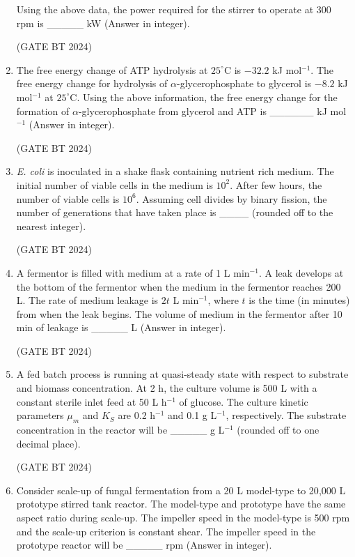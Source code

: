 \documentclass[journal,12pt,onecolumn]{IEEEtran}
\theoremstyle{remark}
\begin{document}
\begin{enumerate}
Using the above data, the power required for the stirrer to operate at 300 rpm is \_\_\_\_\_ kW (Answer in integer).

\hfill (GATE BT 2024)

\item The free energy change of ATP hydrolysis at $25^\circ$C is $-32.2$ kJ mol$^{-1}$. The free energy change for hydrolysis of $\alpha$-glycerophosphate to glycerol is $-8.2$ kJ mol$^{-1}$ at $25^\circ$C. Using the above information, the free energy change for the formation of $\alpha$-glycerophosphate from glycerol and ATP is \_\_\_\_\_\_ kJ mol$^{-1}$ (Answer in integer).

\hfill (GATE BT 2024)

\item \textit{E. coli} is inoculated in a shake flask containing nutrient rich medium. The initial number of viable cells in the medium is $10^2$. After few hours, the number of viable cells is $10^6$. Assuming cell divides by binary fission, the number of generations that have taken place is \_\_\_\_ (rounded off to the nearest integer).

\hfill (GATE BT 2024)

\item A fermentor is filled with medium at a rate of 1 L min$^{-1}$. A leak develops at the bottom of the fermentor when the medium in the fermentor reaches 200 L. The rate of medium leakage is $2t$ L min$^{-1}$, where $t$ is the time (in minutes) from when the leak begins. The volume of medium in the fermentor after 10 min of leakage is \_\_\_\_\_ L (Answer in integer).

\hfill (GATE BT 2024)

\item A fed batch process is running at quasi-steady state with respect to substrate and biomass concentration. At 2 h, the culture volume is 500 L with a constant sterile inlet feed at 50 L h$^{-1}$ of glucose. The culture kinetic parameters $\mu_m$ and $K_S$ are 0.2 h$^{-1}$ and 0.1 g L$^{-1}$, respectively. The substrate concentration in the reactor will be \_\_\_\_\_ g L$^{-1}$ (rounded off to one decimal place).

\hfill (GATE BT 2024)

\item Consider scale-up of fungal fermentation from a 20 L model-type to 20{,}000 L prototype stirred tank reactor. The model-type and prototype have the same aspect ratio during scale-up. The impeller speed in the model-type is 500 rpm and the scale-up criterion is constant shear. The impeller speed in the prototype reactor will be \_\_\_\_\_ rpm (Answer in integer).


\end{enumerate}
\end{document}
